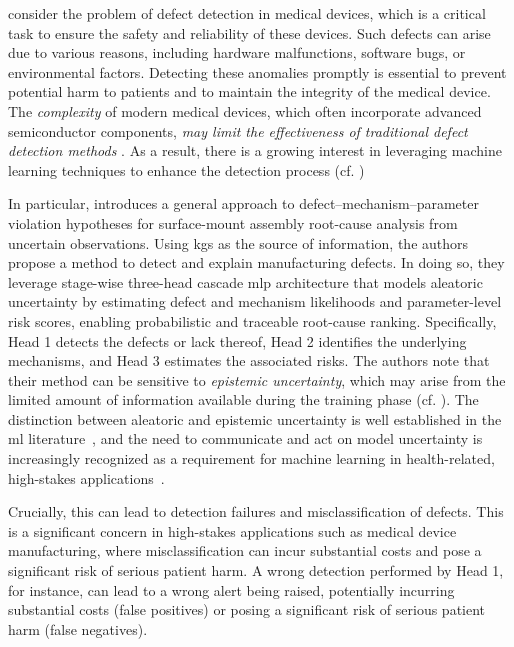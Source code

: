  consider the problem of defect detection in medical devices, which is a critical task to ensure the safety and reliability of these devices. Such defects can arise due to various reasons, including hardware malfunctions, software bugs, or environmental factors. Detecting these anomalies promptly is essential to prevent potential harm to patients and to maintain the integrity of the medical device. The \emph{complexity} of modern medical devices, which often incorporate advanced semiconductor components, \emph{may limit the effectiveness of traditional defect detection methods} \cite{huang2026unsuperviseddefectdetectionsurgical}. As a result, there is a growing interest in leveraging machine learning techniques to enhance the detection process (cf. \cite{bonatti2025expert,
    kim2024deep,lu2019realtime,cao2024xscan})

In particular, \cite{shenoy2026uncertainty} introduces a general approach to defect–mechanism–parameter violation hypotheses for surface-mount assembly root-cause analysis from uncertain observations. Using \glspl*{kg} as the source of information, the authors propose a method to detect and explain manufacturing defects. In doing so, they leverage stage-wise three-head cascade \gls*{mlp} architecture that models aleatoric uncertainty by estimating defect and mechanism likelihoods and parameter-level risk scores, enabling probabilistic and traceable root-cause ranking. Specifically, Head 1 detects the defects or lack thereof, Head 2 identifies the underlying mechanisms, and Head 3 estimates the associated risks. The authors note that their method can be sensitive to \emph{epistemic uncertainty}, which may arise from the limited amount of information available during the training phase (cf. \cite{DBLP:conf/cvpr/Mukhoti0ATG23,lakshminarayanan2017ensembles,kendall2017uncertainties}). The distinction between aleatoric and epistemic uncertainty is well established in the \gls*{ml} literature~\cite{hullermeier2021aleatoric}, and the need to communicate and act on model uncertainty is increasingly recognized as a requirement for machine learning in health-related, high-stakes applications~\cite{kompa2021second,begoli2019need}.

Crucially, this can lead to detection failures and misclassification of defects. This is a significant concern in high-stakes applications such as medical device manufacturing, where misclassification can incur substantial costs and pose a significant risk of serious patient harm. A wrong detection performed by Head 1, for instance, can lead to a wrong alert being raised, potentially incurring substantial costs (false positives) or posing a significant risk of serious patient harm (false negatives).

